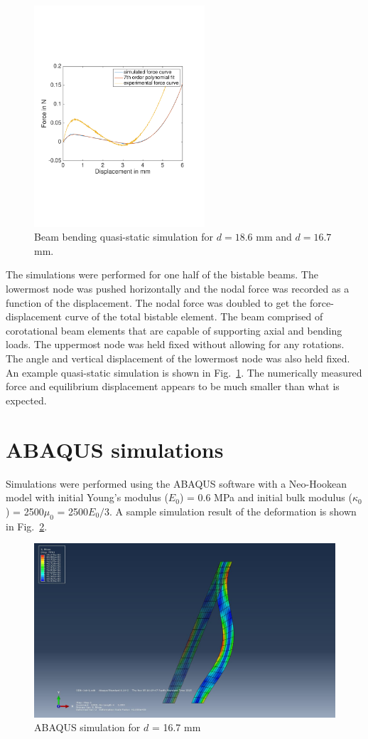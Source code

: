 \documentclass[10pt]{article}
\begin{document}
\begin{figure}[h]
\includegraphics[width=2.5in]{forceDisplacementSimulated2}
\caption{Beam bending quasi-static simulation for $d=18.6$ mm and $d=16.7$ mm.}
\label{fig:simulationQuasiStatic}
\end{figure}
The simulations were performed for one half of the bistable beams. The lowermost node was pushed horizontally and the nodal force was recorded as a function of the displacement. The nodal force was doubled to get the force-displacement curve of the total bistable element. The beam comprised of corotational beam elements that are capable of supporting axial and bending loads. The uppermost node was held fixed without allowing for any rotations. The angle and vertical displacement of the lowermost node was also held fixed. An example quasi-static simulation is shown in Fig.~\ref{fig:simulationQuasiStatic}. The numerically measured force and equilibrium displacement appears to be much smaller than what is expected.

\section{ABAQUS simulations}
Simulations were performed using the ABAQUS software with a Neo-Hookean model with initial Young's modulus ($E_0$) = 0.6 MPa and initial bulk modulus ($\kappa_0$) = 2500$\mu_0$ = 2500$E_0/3$. A sample simulation result of the deformation is shown in Fig.~\ref{fig:simulationAbaqus}.
\begin{figure}[h]
\centering
\includegraphics[width=5.5in]{abaqus}
\caption{ABAQUS simulation for $d$ = 16.7 mm}
\label{fig:simulationAbaqus}
\end{figure}
\end{document}
